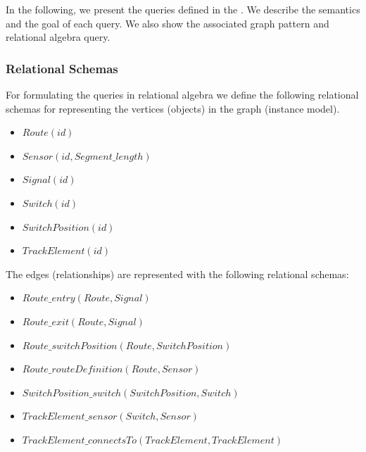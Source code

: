 In the following, we present the queries defined in the \tb{}. We describe the semantics and the goal of each query. We also show the associated graph pattern and relational algebra query.


\subsubsection{Relational Schemas}

For formulating the queries in relational algebra we define the following relational schemas for representing the vertices (objects) in the graph (instance model).

\begin{itemize}
  \item $ \mathit{Route}\left(\mathit{id}\right) $
  \item $ \mathit{Sensor}\left(\mathit{id}, \mathit{Segment\_length}\right) $
  \item $ \mathit{Signal}\left(\mathit{id}\right) $
  \item $ \mathit{Switch}\left(\mathit{id}\right) $
  \item $ \mathit{SwitchPosition}\left(\mathit{id}\right) $
  \item $ \mathit{TrackElement}\left(\mathit{id}\right) $
\end{itemize}

The edges (relationships) are represented with the following relational schemas:

\begin{itemize}
  \item $ \mathit{Route\_entry}\left(\mathit{Route}, \mathit{Signal}\right) $
  \item $ \mathit{Route\_exit}\left(\mathit{Route}, \mathit{Signal}\right) $
  \item $ \mathit{Route\_switchPosition}\left(\mathit{Route}, \mathit{SwitchPosition}\right) $
  \item $ \mathit{Route\_routeDefinition}\left(\mathit{Route}, \mathit{Sensor}\right) $
  \item $ \mathit{SwitchPosition\_switch}\left(\mathit{SwitchPosition}, \mathit{Switch}\right) $
  \item $ \mathit{TrackElement\_sensor}\left(\mathit{Switch}, \mathit{Sensor}\right) $
  \item $ \mathit{TrackElement\_connectsTo}\left(\mathit{TrackElement}, \mathit{TrackElement}\right) $
\end{itemize}

